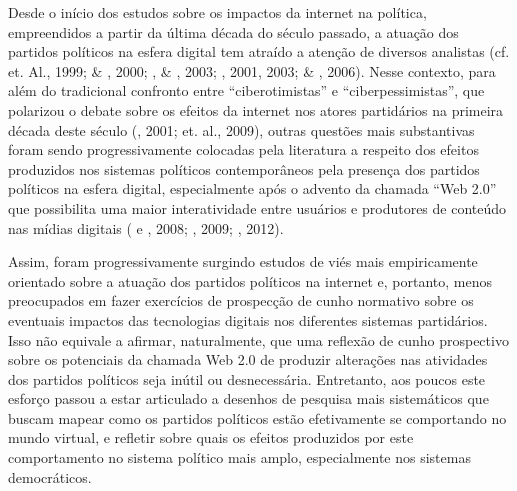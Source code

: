 Desde o início dos estudos sobre os impactos da internet na política,
empreendidos a partir da última década do século passado, a atuação dos
partidos políticos na esfera digital tem atraído a atenção de diversos
analistas (cf.  et. Al., 1999;  \& , 2000; ,
 \& , 2003; , 2001, 2003;  \& , 2006). Nesse
contexto, para além do tradicional confronto entre ``ciberotimistas'' e
``ciberpessimistas'', que polarizou o debate sobre os efeitos da
internet nos atores partidários na primeira década deste século (,
2001;  et. al., 2009), outras questões mais substantivas foram
sendo progressivamente colocadas pela literatura a respeito dos efeitos
produzidos nos sistemas políticos contemporâneos pela presença dos
partidos políticos na esfera digital, especialmente após o advento da
chamada ``Web 2.0'' que possibilita uma maior interatividade entre
usuários e produtores de conteúdo nas mídias digitais ( e ,
2008; , 2009; , 2012).

Assim, foram progressivamente surgindo estudos de viés mais
empiricamente orientado sobre a atuação dos partidos políticos na
internet e, portanto, menos preocupados em fazer exercícios de
prospecção de cunho normativo sobre os eventuais impactos das
tecnologias digitais nos diferentes sistemas partidários. Isso não
equivale a afirmar, naturalmente, que uma reflexão de cunho prospectivo
sobre os potenciais da chamada Web 2.0 de produzir alterações nas
atividades dos partidos políticos seja inútil ou desnecessária.
Entretanto, aos poucos este esforço passou a estar articulado a desenhos
de pesquisa mais sistemáticos que buscam mapear como os partidos
políticos estão efetivamente se comportando no mundo virtual, e refletir
sobre quais os efeitos produzidos por este comportamento no sistema
político mais amplo, especialmente nos sistemas democráticos.

